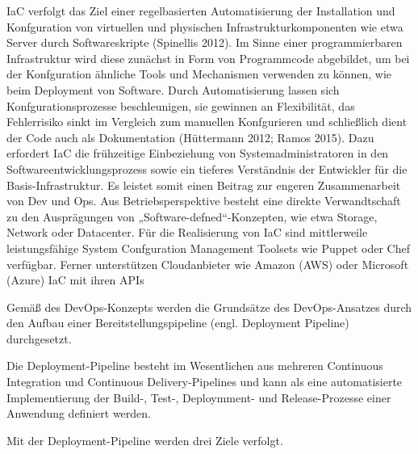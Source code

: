 IaC verfolgt das Ziel einer regelbasierten 
Automatisierung der Installation und Konfguration von virtuellen und physischen Infrastrukturkomponenten wie etwa Server durch Softwareskripte (Spinellis 2012). Im Sinne einer programmierbaren Infrastruktur wird diese zunächst in 
Form von Programmcode abgebildet, um bei der Konfguration ähnliche Tools 
und Mechanismen verwenden zu können, wie beim Deployment von Software. 
Durch Automatisierung lassen sich Konfgurationsprozesse beschleunigen, sie 
gewinnen an Flexibilität, das Fehlerrisiko sinkt im Vergleich zum manuellen Konfgurieren und schließlich dient der Code auch als Dokumentation (Hüttermann 
2012; Ramos 2015). Dazu erfordert IaC die frühzeitige Einbeziehung von Systemadministratoren in den Softwareentwicklungsprozess sowie ein tieferes Verständnis der Entwickler für die Basis-Infrastruktur. Es leistet somit einen Beitrag 
zur engeren Zusammenarbeit von Dev und Ops. Aus Betriebsperspektive besteht 
eine direkte Verwandtschaft zu den Ausprägungen von „Software-defned“-Konzepten, wie etwa Storage, Network oder Datacenter. Für die Realisierung von IaC 
sind mittlerweile leistungsfähige System Confguration Management Toolsets 
wie Puppet oder Chef verfügbar. Ferner unterstützen Cloudanbieter wie Amazon 
(AWS) oder Microsoft (Azure) IaC mit ihren APIs


































Gemäß des DevOps-Konzepts werden die Grundsätze des DevOps-Ansatzes durch den Aufbau einer Bereitstellungspipeline (engl. Deployment Pipeline) durchgesetzt. 

Die Deployment-Pipeline besteht im Wesentlichen aus mehreren Continuous Integration und Continuous Delivery-Pipelines und kann als eine automatisierte Implementierung der Build-, Test-, Deploymment- und Release-Prozesse einer Anwendung definiert werden. 

Mit der Deployment-Pipeline werden drei Ziele verfolgt. \cite[S. 3 - 4]{humble_continuous_2011} 

